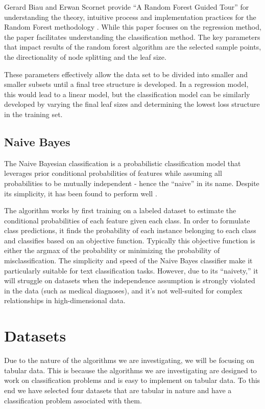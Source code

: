 \documentclass[10pt,twocolumn,letterpaper]{article}
\begin{document}
Gerard Biau and Erwan Scornet provide “A Random Forest Guided Tour” for understanding the theory, intuitive process and implementation practices for the Random Forest methodology \cite{randomforesttour}.
While this paper focuses on the regression method, the paper facilitates understanding the classification method.
The key parameters that impact results of the random forest algorithm are the selected sample points, the directionality of node splitting and the leaf size.

These parameters effectively allow the data set to be divided into smaller and smaller subsets until a final tree structure is developed.
In a regression model, this would lead to a linear model, but the classification model can be similarly developed by varying the final leaf sizes and determining the lowest loss structure in the training set.

\subsection{Naive Bayes}

The Naive Bayesian classification is a probabilistic classification model that leverages prior conditional probabilities of features while assuming all probabilities to be mutually independent - hence the “naive” in its name.
Despite its simplicity, it has been found to perform well \cite{domingos,webb}. 

The algorithm works by first training on a labeled dataset to estimate the conditional probabilities of each feature given each class.
In order to formulate class predictions, it finds the probability of each instance belonging to each class and classifies based on an objective function.
Typically this objective function is either the argmax of the probability or minimizing the probability of misclassification.
The simplicity and speed of the Naive Bayes classifier make it particularly suitable for text classification tasks.
However, due to its “naivety,” it will struggle on datasets when the independence assumption is strongly violated in the data (such as medical diagnoses), and it’s not well-suited for complex relationships in high-dimensional data.


\section{Datasets}

Due to the nature of the algorithms we are investigating, we will be focusing on tabular data.
This is because the algorithms we are investigating are designed to work on classification problems and is easy to implement on tabular data.
To this end we have selected four datasets that are tabular in nature and have a classification problem associated with them.
\end{document}
